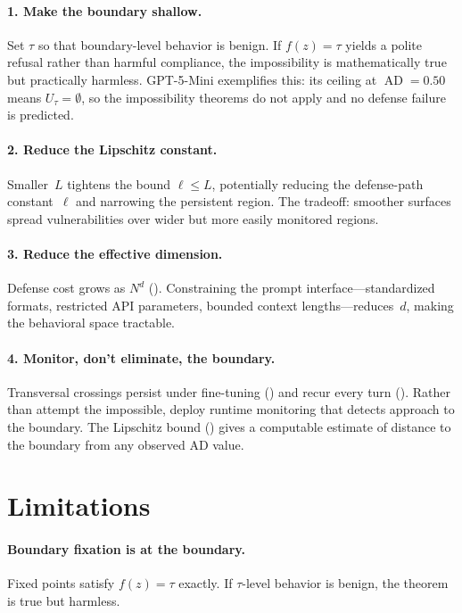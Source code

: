 \documentclass[11pt]{article}
\newcommand{\AD}{\operatorname{AD}}
\begin{document}
\paragraph{1. Make the boundary shallow.}
Set $\tau$ so that boundary-level behavior is benign. If $f(z) = \tau$
yields a polite refusal rather than harmful compliance, the
impossibility is mathematically true but practically harmless.
GPT-5-Mini exemplifies this: its ceiling at $\AD = 0.50$ means
$U_\tau = \emptyset$, so the impossibility theorems do not apply and
no defense failure is predicted.

\paragraph{2. Reduce the Lipschitz constant.}
Smaller~$L$ tightens the bound $\ell \leq L$, potentially reducing
the defense-path constant~$\ell$ and narrowing the persistent region.
The tradeoff: smoother surfaces spread vulnerabilities over wider but
more easily monitored regions.

\paragraph{3. Reduce the effective dimension.}
Defense cost grows as $N^d$ (). Constraining the prompt
interface---standardized formats, restricted API parameters, bounded
context lengths---reduces~$d$, making the behavioral space tractable.

\paragraph{4. Monitor, don't eliminate, the boundary.}
Transversal crossings persist under fine-tuning ()
and recur every turn (). Rather than attempt the
impossible, deploy runtime monitoring that detects approach to the
boundary. The Lipschitz bound () gives a
computable estimate of distance to the boundary from any observed AD
value.

\section{Limitations}
\label{sec:limitations}

\paragraph{Boundary fixation is at the boundary.}
Fixed points satisfy $f(z) = \tau$ exactly. If $\tau$-level behavior
is benign, the theorem is true but harmless.
\end{document}
